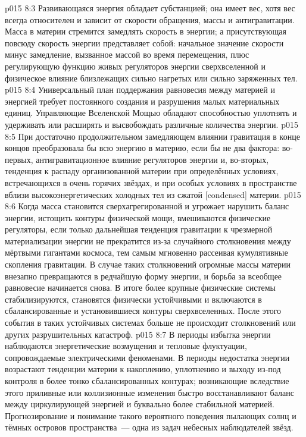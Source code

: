\vs p015 8:3 \pc Развивающаяся энергия обладает субстанцией; она имеет вес, хотя вес всегда относителен и зависит от скорости обращения, массы и антигравитации. Масса в материи стремится замедлять скорость в энергии; а присутствующая повсюду скорость энергии представляет собой: начальное значение скорости минус замедление, вызванное массой во время перемещения, плюс регулирующую функцию живых регуляторов энергии сверхвселенной и физическое влияние близлежащих сильно нагретых или сильно заряженных тел.
\vs p015 8:4 Универсальный план поддержания равновесия между материей и энергией требует постоянного создания и разрушения малых материальных единиц. Управляющие Вселенской Мощью обладают способностью уплотнять и удерживать или расширять и высвобождать различные количества энергии.
\vs p015 8:5 При достаточно продолжительном замедляющем влиянии гравитация в конце концов преобразовала бы всю энергию в материю, если бы не два фактора: во\hyp{}первых, антигравитационное влияние регуляторов энергии и, во\hyp{}вторых, тенденция к распаду организованной материи при определённых условиях, встречающихся в очень горячих звёздах, и при особых условиях в пространстве вблизи высокоэнергетических холодных тел из сжатой [condensed] материи.
\vs p015 8:6 Когда масса становится сверхагрегированной и угрожает нарушить баланс энергии, истощить контуры физической мощи, вмешиваются физические регуляторы, если только дальнейшая тенденция гравитации к чрезмерной материализации энергии не прекратится из\hyp{}за случайного столкновения между мёртвыми гигантами космоса, тем самым мгновенно рассеивая кумулятивные скопления гравитации. В случае таких столкновений огромные массы материи внезапно превращаются в редчайшую форму энергии, и борьба за всеобщее равновесие начинается снова. В итоге более крупные физические системы стабилизируются, становятся физически устойчивыми и включаются в сбалансированные и установившиеся контуры сверхвселенных. После этого события в таких устойчивых системах больше не происходит столкновений или других разрушительных катастроф.
\vs p015 8:7 В периоды избытка энергии наблюдаются энергетические возмущения и тепловые флуктуации, сопровождаемые электрическими феноменами. В периоды недостатка энергии возрастают тенденции материи к накоплению, уплотнению и выходу из\hyp{}под контроля в более тонко сбалансированных контурах; возникающие вследствие этого приливные или коллизионные изменения быстро восстанавливают баланс между циркулирующей энергией и буквально более стабильной материей. Прогнозирование и понимание такого вероятного поведения пылающих солнц и тёмных островов пространства~--- одна из задач небесных наблюдателей звёзд.
